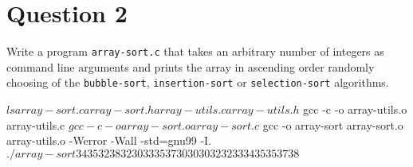 
\section*{Question 2}

Write a program \texttt{array-sort.c} that takes an arbitrary number of integers as command line arguments and prints the array in ascending order randomly choosing of the \texttt{bubble-sort}, \texttt{insertion-sort} or \texttt{selection-sort} algorithms.

\begin{terminal}
$ ls
array-sort.c array-sort.h array-utils.c array-utils.h
$ gcc -c -o array-utils.o array-utils.c
$ gcc -c -o array-sort.o array-sort.c
$ gcc -o array-sort array-sort.o array-utils.o -Werror -Wall -std=gnu99 -I.
$ ./array-sort 34 35 32 38 32 30 33 35 37 30
30 30 32 32 33 34 35 35 37 38
$
\end{terminal}
